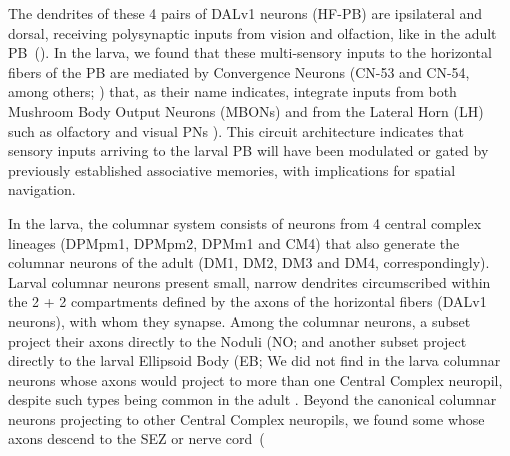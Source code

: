    The dendrites of these 4 pairs of DALv1 neurons (HF-PB) are ipsilateral and dorsal, receiving polysynaptic inputs from vision and olfaction, like in the adult PB~(\citep{hulse2021connectome}). In the larva, we found that these multi-sensory inputs to the horizontal fibers of the PB are mediated by Convergence Neurons (CN-53 and CN-54, among others; \citealp{eschbach2021}) that, as their name indicates, integrate inputs from both Mushroom Body Output Neurons (MBONs) and from the Lateral Horn (LH) such as olfactory and visual PNs \citep{EsbachFushiki2021}). This circuit architecture indicates that sensory inputs arriving to the larval PB will have been modulated or gated by previously established associative memories, with implications for spatial navigation.



    In the larva, the columnar system consists of neurons from 4 central complex lineages (DPMpm1, DPMpm2, DPMm1 and CM4) that also generate the columnar neurons of the adult (DM1, DM2, DM3 and DM4, correspondingly).
    Larval columnar neurons present small, narrow dendrites circumscribed within the 2 + 2 compartments defined by the axons of the horizontal fibers (DALv1 neurons), with whom they synapse.
    Among the columnar neurons, a subset project their axons directly to the Noduli (NO; %
    and another subset project directly to the larval Ellipsoid Body (EB;%
    We did not find in the larva columnar neurons whose axons would project to more than one Central Complex neuropil, despite such types being common in the adult \citep{wolff2015neuroarchitecture, wolff2018neuroarchitecture, hulse2021connectome}.
    Beyond the canonical columnar neurons projecting to other Central Complex neuropils, we found some whose axons descend to the SEZ or nerve cord~(%

